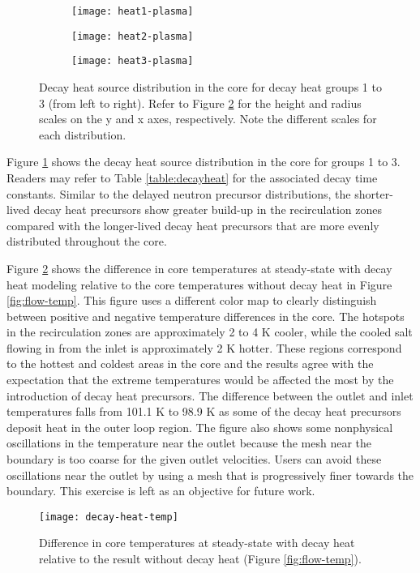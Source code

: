 \begin{figure}[htbp!]
    \centering
    \begin{subfigure}[t]{.325\textwidth}
        \centering
        \texttt{[image: heat1-plasma]}
    \end{subfigure}
    \begin{subfigure}[t]{.325\textwidth}
        \centering
        \texttt{[image: heat2-plasma]}
    \end{subfigure}
    \begin{subfigure}[t]{.325\textwidth}
        \centering
        \texttt{[image: heat3-plasma]}
    \end{subfigure}
    \caption{Decay heat source distribution in the core for decay heat groups
    1 to 3 (from left to right). Refer to Figure \ref{fig:decayheattemp} for
    the height and radius scales on the y and x axes, respectively. Note the
    different scales for each distribution.}
    \label{fig:decayheat}
\end{figure}

Figure \ref{fig:decayheat} shows the decay heat source distribution in the
core for groups 1 to 3. Readers may refer to Table
\ref{table:decayheat} for the associated decay time constants.
Similar to the delayed neutron precursor distributions, the shorter-lived
decay heat precursors show greater build-up in the recirculation zones
compared with the longer-lived decay heat precursors that are more evenly
distributed throughout the core.

Figure \ref{fig:decayheattemp} shows the
difference in core temperatures at steady-state with decay heat modeling
relative to the core temperatures without decay heat in Figure
\ref{fig:flow-temp}. This figure uses a different color map to clearly
distinguish between positive and negative temperature differences in the core.
The hotspots in the recirculation zones are approximately
2 to 4 K cooler, while the cooled salt flowing in from the inlet is
approximately 2 K hotter. These regions correspond to the hottest and coldest
areas in the core and the results agree with the expectation that the extreme
temperatures would be affected the most by the introduction of decay heat
precursors. The difference between the outlet and inlet temperatures falls
from 101.1 K to 98.9 K as some of the decay heat precursors deposit heat in
the outer loop region. The figure also shows some nonphysical oscillations in
the temperature near the outlet because the mesh near the boundary is too
coarse for the given outlet velocities. Users can avoid these oscillations
near the outlet by using a mesh that is progressively finer towards the
boundary. This exercise is left as an objective for future work.

\begin{figure}[htbp!]
    \centering
    \texttt{[image: decay-heat-temp]}
    \caption{Difference in core temperatures at steady-state with decay heat
    relative to the result without decay heat (Figure \ref{fig:flow-temp}).}
    \label{fig:decayheattemp}
\end{figure}
